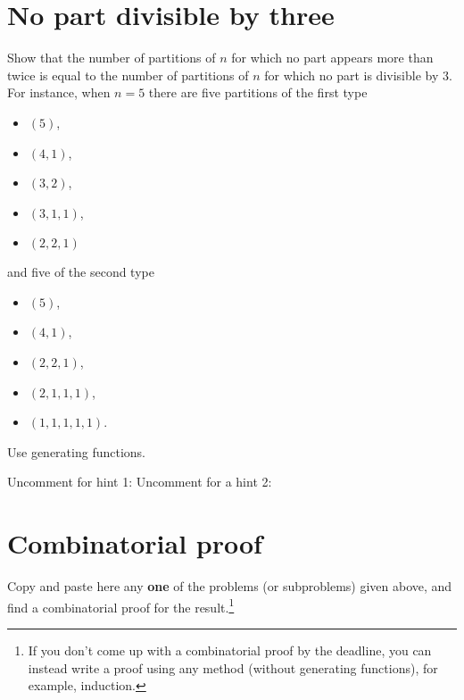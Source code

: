 \documentclass[10pt]{amsart}
\begin{document}
\section{No part divisible by three}
Show that the number of partitions of $n$ for which no part appears more than twice is equal to the number of partitions of $n$ for which no part is divisible by $3$. For instance, when $n = 5$ there are five partitions of the first type 
\begin{itemize}
\item $(5)$, 
\item $(4,1)$, 
\item $(3,2)$, 
\item $(3,1,1)$, 
\item $(2,2,1)$ 
\end{itemize}
and five of the second type 
\begin{itemize}
\item $(5)$, 
\item $(4,1)$,
\item $(2,2,1)$,
\item $(2,1,1,1)$, 
\item $(1,1,1,1,1)$. 
\end{itemize}
Use generating functions.

\noindent Uncomment for hint 1:
\noindent Uncomment for a hint 2:




\section{Combinatorial proof}
Copy and paste here any \textbf{one} of the problems (or subproblems) given above, and find a combinatorial proof for the result.\footnote{If you don't come up with a combinatorial proof by the deadline, you can instead write a proof using any method (without generating functions), for example, induction. }
\end{document}
